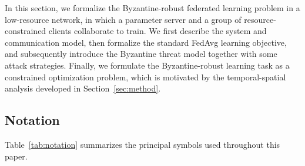 \documentclass[journal]{IEEEtran}
\begin{document}
In this section, we formalize the Byzantine-robust federated learning problem in a low-resource network, in which a parameter server and a group of resource-constrained clients collaborate to train. We first describe the system and communication model, then formalize the standard FedAvg learning objective, and subsequently introduce the Byzantine threat model together with some attack strategies. Finally, we formulate the Byzantine-robust learning task as a constrained optimization problem, which is motivated by the temporal-spatial analysis developed in Section~\ref{sec:method}.

\subsection{Notation}

Table~\ref{tab:notation} summarizes the principal symbols used throughout this paper.
\end{document}
